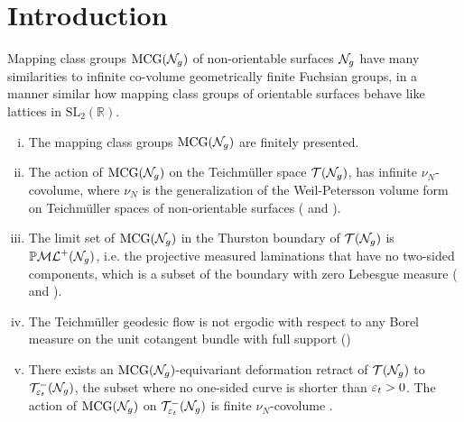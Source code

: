 \section{Introduction}
\label{sec:introduction}


Mapping class groups $\mathrm{MCG}(\mathcal{N}_g)$ of non-orientable surfaces $\mathcal{N}_g$ have many similarities to infinite co-volume geometrically finite Fuchsian groups, in a manner similar how mapping class groups of orientable surfaces behave like lattices in $\mathrm{SL}_2(\mathbb{R})$.

\begin{enumerate}[(i)]
\item The mapping class groups $\mathrm{MCG}(\mathcal{N}_g)$ are finitely presented.
\item The action of $\mathrm{MCG}(\mathcal{N}_g)$ on the Teichmüller space $\mathcal{T}(\mathcal{N}_g)$, has infinite $\nu_N$-covolume, where $\nu_N$ is the generalization of the Weil-Petersson volume form on Teichmüller spaces of non-orientable surfaces (\cite[Theorem 17.1]{gendulphe2017whats} and \cite{norbury2008lengths}).
\item The limit set of $\mathrm{MCG}(\mathcal{N}_g)$ in the Thurston boundary of $\mathcal{T}(\mathcal{N}_g)$ is $\mathbb{P}\mathcal{ML}^+(\mathcal{N}_g)$, i.e. the projective measured laminations that have no two-sided components, which is a subset of the boundary with zero Lebesgue measure (\cite{erlandsson2023mapping} and \cite{limitsetkhan}).
\item The Teichmüller geodesic flow is not ergodic with respect to any Borel measure on the unit cotangent bundle with full support (\cite[Proposition 17.5]{gendulphe2017whats})
\item There exists an $\mathrm{MCG}(\mathcal{N}_g)$-equivariant deformation retract of $\mathcal{T}(\mathcal{N}_g)$ to $\mathcal{T}_{\varepsilon_t}^{-}(\mathcal{N}_g)$, the subset where no one-sided curve is shorter than $\varepsilon_t > 0$. The action of $\mathrm{MCG}(\mathcal{N}_g)$ on $\mathcal{T}_{\varepsilon_t}^{-}(\mathcal{N}_g)$ is finite $\nu_N$-covolume \cite[Proposition 19.1]{gendulphe2017whats}.
\end{enumerate}

